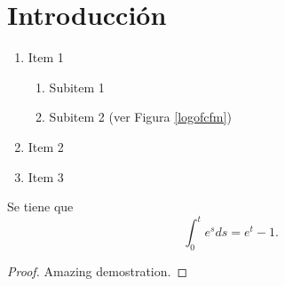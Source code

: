 \chapter{Introducción}

\lipsum[30-35]
\begin{enumerate}
    \item Item 1
          \begin{enumerate}
              \item Subitem 1
              \item Subitem 2 (ver Figura \ref{logofcfm})
          \end{enumerate}
    \item Item 2
    \item Item 3
\end{enumerate}
\begin{theorem}
    Se tiene que $$\int_0^t e^sds=e^t-1.$$
\end{theorem}
\begin{proof}
    Amazing demostration.
\end{proof}
\lipsum[36-40]